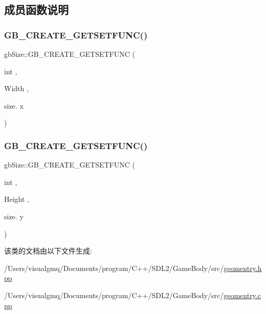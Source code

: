 \subsection{成员函数说明}
\mbox{\label{classgb_size_a4f800a6e37ba8b5b93ab1c9b5f905bd0}} 
\subsubsection{\texorpdfstring{GB\_CREATE\_GETSETFUNC()}{GB\_CREATE\_GETSETFUNC()}\hspace{0.1cm}{\footnotesize\ttfamily [1/2]}}
{\footnotesize\ttfamily gb\+Size\+::\+G\+B\+\_\+\+C\+R\+E\+A\+T\+E\+\_\+\+G\+E\+T\+S\+E\+T\+F\+U\+NC (\begin{DoxyParamCaption}\item[{int}]{,  }\item[{Width}]{,  }\item[{size.}]{x }\end{DoxyParamCaption})}

\mbox{\label{classgb_size_af52b9c5cd6fceccaca9b80a86f90a380}} 
\subsubsection{\texorpdfstring{GB\_CREATE\_GETSETFUNC()}{GB\_CREATE\_GETSETFUNC()}\hspace{0.1cm}{\footnotesize\ttfamily [2/2]}}
{\footnotesize\ttfamily gb\+Size\+::\+G\+B\+\_\+\+C\+R\+E\+A\+T\+E\+\_\+\+G\+E\+T\+S\+E\+T\+F\+U\+NC (\begin{DoxyParamCaption}\item[{int}]{,  }\item[{Height}]{,  }\item[{size.}]{y }\end{DoxyParamCaption})}



该类的文档由以下文件生成\+:\begin{DoxyCompactItemize}
\item 
/\+Users/visualgmq/\+Documents/program/\+C++/\+S\+D\+L2/\+Game\+Body/src/\mbox{\hyperlink{geomentry_8hpp}{geomentry.\+hpp}}\item 
/\+Users/visualgmq/\+Documents/program/\+C++/\+S\+D\+L2/\+Game\+Body/src/\mbox{\hyperlink{geomentry_8cpp}{geomentry.\+cpp}}\end{DoxyCompactItemize}
